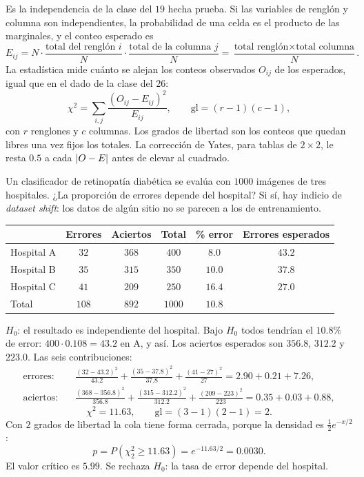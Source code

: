 \documentclass[11pt,letterpaper]{article}
\begin{document}
Es la independencia de la clase del $19$ hecha prueba. Si las variables
de renglón y columna son independientes, la probabilidad de una celda
es el producto de las marginales, y el conteo esperado es
\[
    E_{ij} = N \cdot \frac{\text{total del renglón } i}{N}
               \cdot \frac{\text{total de la columna } j}{N}
           = \frac{\text{total renglón} \times
                   \text{total columna}}{N} .
\]
La estadística mide cuánto se alejan los conteos observados $O_{ij}$ de
los esperados, igual que en el dado de la clase del $26$:
\[
    \chi^2 = \sum_{i, j} \frac{(O_{ij} - E_{ij})^2}{E_{ij}} ,
    \qquad
    \text{gl} = (r - 1)(c - 1) ,
\]
con $r$ renglones y $c$ columnas. Los grados de libertad son los
conteos que quedan libres una vez fijos los totales. La corrección de
Yates, para tablas de $2 \times 2$, le resta $0.5$ a cada
$\left\lvert O - E \right\rvert$ antes de elevar al cuadrado.

\begin{ejemplo}
    Un clasificador de retinopatía diabética se evalúa con $1000$
    imágenes de tres hospitales. ¿La proporción de errores depende del
    hospital? Si sí, hay indicio de \emph{dataset shift}: los datos de
    algún sitio no se parecen a los de entrenamiento.
    \begin{center}
    \small
    \begin{tabular}{lccccc}
        \toprule
        & \textbf{Errores} & \textbf{Aciertos} & \textbf{Total}
        & \textbf{\% error} & \textbf{Errores esperados} \\
        \midrule
        Hospital A & $32$ & $368$ & $400$ & $8.0$ & $43.2$ \\
        Hospital B & $35$ & $315$ & $350$ & $10.0$ & $37.8$ \\
        Hospital C & $41$ & $209$ & $250$ & $16.4$ & $27.0$ \\
        \midrule
        Total & $108$ & $892$ & $1000$ & $10.8$ & \\
        \bottomrule
    \end{tabular}
    \end{center}
    $H_0$: el resultado es independiente del hospital. Bajo $H_0$ todos
    tendrían el $10.8\%$ de error: $400 \cdot 0.108 = 43.2$ en A, y así.
    Los aciertos esperados son $356.8$, $312.2$ y $223.0$. Las seis
    contribuciones:
    \begin{align*}
        \text{errores:}\quad
        &\frac{(32 - 43.2)^2}{43.2} + \frac{(35 - 37.8)^2}{37.8}
         + \frac{(41 - 27)^2}{27} = 2.90 + 0.21 + 7.26 , \\
        \text{aciertos:}\quad
        &\frac{(368 - 356.8)^2}{356.8} + \frac{(315 - 312.2)^2}{312.2}
         + \frac{(209 - 223)^2}{223} = 0.35 + 0.03 + 0.88 ,
    \end{align*}
    \[
        \chi^2 = 11.63 , \qquad \text{gl} = (3 - 1)(2 - 1) = 2 .
    \]
    Con $2$ grados de libertad la cola tiene forma cerrada, porque la
    densidad es $\frac{1}{2} e^{-x/2}$:
    \[
        p = P(\chi^2_2 \ge 11.63) = e^{-11.63 / 2} = 0.0030 .
    \]
    El valor crítico es $5.99$. Se rechaza $H_0$: la tasa de error
    depende del hospital.
\end{ejemplo}
\end{document}
